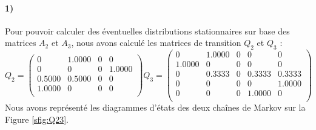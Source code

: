 \documentclass[a4paper,titlepage]{report}
\begin{document}
\paragraph{1)} Pour pouvoir calculer des éventuelles distributions stationnaires sur base des matrices $A_2$ et $A_3$, nous avons calculé les matrices de transition $Q_2$ et $Q_3$ : 
\[
Q_2 = 
\begin{pmatrix}
         0 &   1.0000  &       0  &       0 \\
         0 &        0  &       0  &  1.0000 \\
    0.5000 &   0.5000  &       0  &       0 \\
    1.0000 &        0  &       0  &       0 \\
\end{pmatrix}
Q_3 = 
\begin{pmatrix}
        0  &   1.0000   &      0  &       0  &       0 \\
    1.0000 &        0   &      0  &       0  &       0 \\
         0 &   0.3333   &      0  &  0.3333  &  0.3333 \\
         0 &        0   &      0  &       0  &  1.0000 \\
         0 &        0   &      0  &  1.0000  &       0 \\
\end{pmatrix}
\]
Nous avons représenté les diagrammes d'états des deux chaînes de Markov sur la Figure \ref{sfig:Q23}. 
\end{document}
